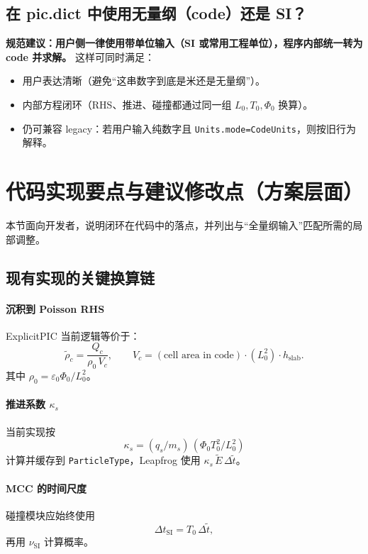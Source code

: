 \documentclass[11pt,a4paper]{ctexart}
\begin{document}
\subsection{在 pic.dict 中使用无量纲（code）还是 SI？}
\textbf{规范建议：用户侧一律使用带单位输入（SI 或常用工程单位），程序内部统一转为 code 并求解。}
这样可同时满足：
\begin{itemize}[leftmargin=2em]
  \item 用户表达清晰（避免“这串数字到底是米还是无量纲”）。
  \item 内部方程闭环（RHS、推进、碰撞都通过同一组 $L_0,T_0,\Phi_0$ 换算）。
  \item 仍可兼容 legacy：若用户输入纯数字且 \texttt{Units.mode=CodeUnits}，则按旧行为解释。
\end{itemize}

\section{代码实现要点与建议修改点（方案层面）}
本节面向开发者，说明闭环在代码中的落点，并列出与“全量纲输入”匹配所需的局部调整。

\subsection{现有实现的关键换算链}
\paragraph{沉积到 Poisson RHS}
ExplicitPIC 当前逻辑等价于：
\begin{equation}
\tilde{\rho}_c = \frac{Q_c}{\rho_0\,V_c},\qquad V_c = (\text{cell area in code})\cdot (L_0^2)\cdot h_{\mathrm{slab}}.
\end{equation}
其中 $\rho_0=\varepsilon_0\Phi_0/L_0^2$。

\paragraph{推进系数 $\kappa_s$}
当前实现按
\begin{equation}
\kappa_s = (q_s/m_s)\,(\Phi_0 T_0^2/L_0^2)
\end{equation}
计算并缓存到 \texttt{ParticleType}，Leapfrog 使用 $\kappa_s\,\tilde{E}\,\Delta\tilde{t}$。

\paragraph{MCC 的时间尺度}
碰撞模块应始终使用
\begin{equation}
\Delta t_{\mathrm{SI}} = T_0\,\Delta\tilde{t},
\end{equation}
再用 $\nu_{\mathrm{SI}}$ 计算概率。
\end{document}
